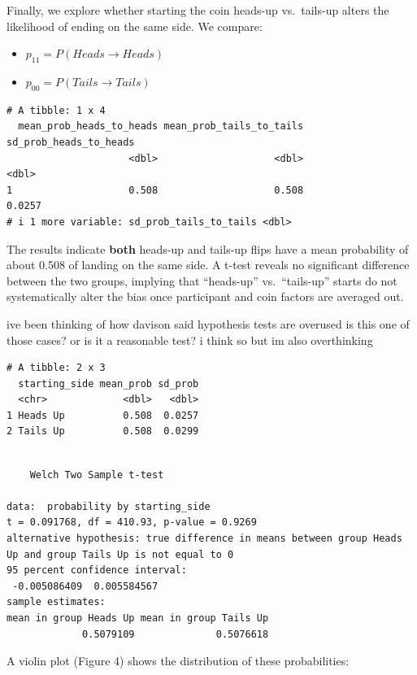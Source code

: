 \documentclass[
  letterpaper,
  DIV=11,
  numbers=noendperiod]{scrartcl}
\begin{document}
Finally, we explore whether starting the coin heads-up vs.~tails-up
alters the likelihood of ending on the same side. We compare:

\begin{itemize}
\item
  \(p_{11}=P(Heads→Heads)\)
\item
  \(p_{00}=P(Tails→Tails)\)
\end{itemize}

\begin{verbatim}
# A tibble: 1 x 4
  mean_prob_heads_to_heads mean_prob_tails_to_tails sd_prob_heads_to_heads
                     <dbl>                    <dbl>                  <dbl>
1                    0.508                    0.508                 0.0257
# i 1 more variable: sd_prob_tails_to_tails <dbl>
\end{verbatim}

The results indicate \textbf{both} heads-up and tails-up flips have a
mean probability of about 0.508 of landing on the same side. A t-test
reveals no significant difference between the two groups, implying that
``heads-up'' vs.~``tails-up'' starts do not systematically alter the
bias once participant and coin factors are averaged out.

ive been thinking of how davison said hypothesis tests are overused is
this one of those cases? or is it a reasonable test? i think so but im
also overthinking

\begin{verbatim}
# A tibble: 2 x 3
  starting_side mean_prob sd_prob
  <chr>             <dbl>   <dbl>
1 Heads Up          0.508  0.0257
2 Tails Up          0.508  0.0299
\end{verbatim}

\begin{verbatim}

    Welch Two Sample t-test

data:  probability by starting_side
t = 0.091768, df = 410.93, p-value = 0.9269
alternative hypothesis: true difference in means between group Heads Up and group Tails Up is not equal to 0
95 percent confidence interval:
 -0.005086409  0.005584567
sample estimates:
mean in group Heads Up mean in group Tails Up 
             0.5079109              0.5076618 
\end{verbatim}

A violin plot (Figure 4) shows the distribution of these probabilities:
\end{document}
